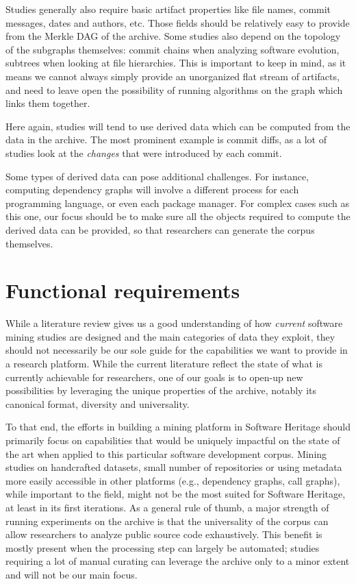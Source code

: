 Studies generally also require basic artifact properties like file names,
commit messages, dates and authors, etc. Those fields should be relatively easy
to provide from the Merkle DAG of the archive. Some studies also depend on the
topology of the subgraphs themselves: commit chains when analyzing software
evolution, subtrees when looking at file hierarchies. This is important to keep
in mind, as it means we cannot always simply provide an unorganized flat stream
of artifacts, and need to leave open the possibility of running algorithms on
the graph which links them together.

Here again, studies will tend to use derived data which can be computed from
the data in the archive. The most prominent example is commit diffs, as a lot
of studies look at the \emph{changes} that were introduced by each commit.

Some types of derived data can pose additional challenges. For instance,
computing dependency graphs will involve a different process for each
programming language, or even each package manager. For complex cases such as
this one, our focus should be to make sure all the objects required to compute
the derived data can be provided, so that researchers can generate the corpus
themselves.

\section{Functional requirements}

While a literature review gives us a good understanding of how \emph{current}
software mining studies are designed and the main categories of data they
exploit, they should not necessarily be our sole guide for the capabilities we
want to provide in a research platform. While the current literature reflect
the state of what is currently achievable for researchers, one of our goals is
to open-up new possibilities by leveraging the unique properties of the
archive, notably its canonical format, diversity and universality.

To that end, the efforts in building a mining platform in Software Heritage
should primarily focus on capabilities that would be uniquely impactful on the
state of the art when applied to this particular software development corpus.
Mining studies on handcrafted datasets, small number of repositories or
using metadata more easily accessible in other platforms (e.g., dependency
graphs, call graphs), while important to the field, might not be the most
suited for Software Heritage, at least in its first iterations. As a general
rule of thumb, a major strength of running experiments on the archive is that
the universality of the corpus can allow researchers to analyze public source
code exhaustively. This benefit is mostly present when the processing step can
largely be automated; studies requiring a lot of manual curating can leverage
the archive only to a minor extent and will not be our main focus.

